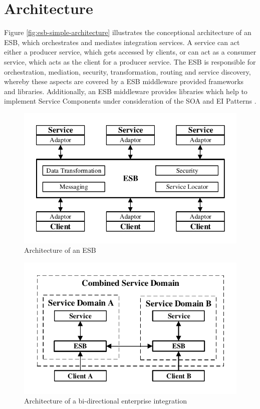 \section{Architecture}
\label{sec:esb-architecture}
Figure \vref{fig:esb-simple-architecture} illustrates the conceptional architecture of an ESB, which orchestrates and mediates integration services. A service can act either a producer service, which gets accessed by clients, or can act as a consumer service, which acts as the client for a producer service. The ESB is responsible for orchestration, mediation, security, transformation, routing and service discovery, whereby these aspects are covered by a ESB middleware provided frameworks and libraries. Additionally, an ESB middleware provides libraries which help to implement Service Components under consideration of the SOA and EI Patterns \cite{EsbSoa2018, MediationESB2005}.

\begin{figure}[htbp]
	\centering
	\includegraphics[scale=1]{images/esb-simple-architecture.pdf}
	\caption{Architecture of an ESB}
	\label{fig:esb-simple-architecture}
\end{figure} 

\begin{figure}[htbp]
	\centering
	\includegraphics[scale=1]{images/esb-bidirectional-integration.pdf}
	\caption{Architecture of a bi-directional enterprise integration}
	\label{fig:esb-bidirectional-integration}
\end{figure} 

